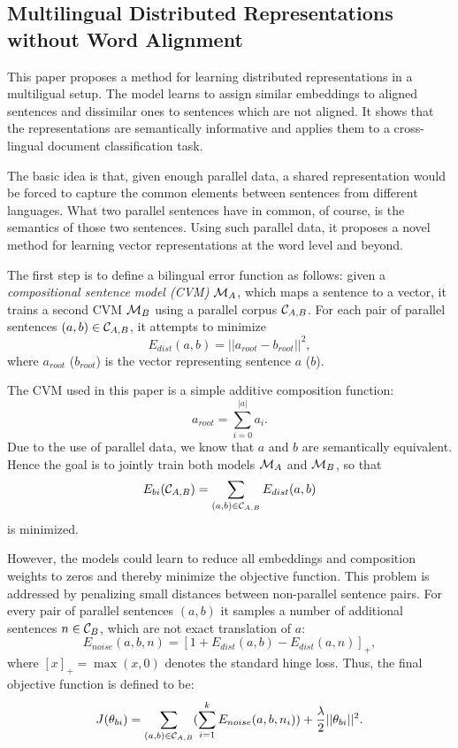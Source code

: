 \subsection{Multilingual Distributed Representations without Word Alignment \cite{Hermann2013}}

This paper proposes a method for learning distributed representations in a multiligual setup. The model learns to assign similar embeddings to aligned sentences and dissimilar ones to sentences which are not aligned. It shows that the representations are semantically informative and applies them to a cross-lingual document classification task.

The basic idea is that, given enough parallel data, a shared representation would be forced to capture the common elements between sentences from different languages. What two parallel sentences have in common, of course, is the semantics of those two sentences. Using such parallel data, it proposes a novel method for learning vector representations at the word level and beyond.

The first step is to define a bilingual error function as follows: given a \emph{compositional sentence model (CVM)} $\mathcal{M}_A$, which maps a sentence to a vector, it trains a second CVM $\mathcal{M}_B$ using a parallel corpus $\mathcal{C}_{A,B}$. For each pair of parallel sentences $(a,b) \in \mathcal{C}_{A,B}$, it attempts to minimize
$$E_{dist}(a,b) = ||a_{root} - b_{root}||^2,$$
where $a_{root}$ ($b_{root}$) is the vector representing sentence $a$ ($b$).

The CVM used in this paper is a simple additive composition function:
$$a_{root}= \sum_{i=0}^{|a|} a_i.$$
Due to the use of parallel data, we know that $a$ and $b$ are semantically equivalent. Hence the goal is to jointly train both models $\mathcal{M}_A$ and $\mathcal{M}_B$, so that
$$E_{bi}(\mathcal{C}_{A,B}) = \sum_{(a,b) \in \mathcal{C}_{A,B}} E_{dist}(a,b)$$
is minimized.

However, the models could learn to reduce all embeddings and composition weights to zeros and thereby minimize the objective function. This problem is addressed by penalizing small distances between non-parallel sentence pairs. For every pair of parallel sentences $(a,b)$ it samples a number of additional sentences $n \in \mathcal{C}_B$, which are not exact translation of $a$:
$$E_{noise}(a, b, n) = [1 + E_{dist}(a,b) - E_{dist}(a,n)]_{+},$$
where $[x]_{+} = \max(x,0)$ denotes the standard hinge loss. Thus, the final objective function is defined to be:
$$J(\theta_{bi}) = \sum_{(a,b) \in \mathcal{C}_{A,B}} (\sum_{i=1}^k E_{noise}(a,b,n_i)) + \frac{\lambda}{2} || \theta_{bi} ||^2.$$

